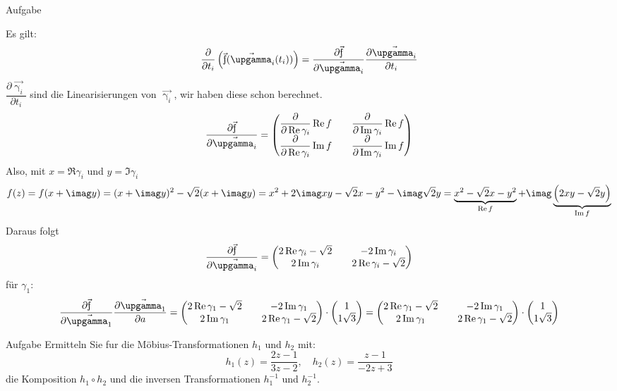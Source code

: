 \documentclass{scrartcl}
\begin{document}
\begin{section}{Aufgabe}
\begin{itemize}
Es gilt: \[\frac{\partial}{\partial t_i}\left(\f(\vec{\upgamma}_i(t_i))\right)=\dfrac{\partial \f}{\partial \vec{\upgamma_i}}\dfrac{\partial \vec{\upgamma_i}}{\partial t_i}\]
\(\dfrac{\partial \vec{\upgamma_i}}{\partial t_i}\) sind die Linearisierungen von $\vec{\upgamma_i}$, wir haben diese schon berechnet.
\[\dfrac{\partial \f}{\partial \vec{\upgamma_i}}=
\begin{pmatrix}
    \dfrac{\partial}{\partial \Re \gamma_i}\Re f&& \dfrac{\partial}{\partial \Im \gamma_i}\Re f\\
    \dfrac{\partial}{\partial \Re \gamma_i}\Im f&& \dfrac{\partial}{\partial \Im \gamma_i}\Im f
\end{pmatrix}\]
Also, mit \(x=\Re \gamma_i\) und \(y=\Im \gamma_i\)
\[f(z)=f(x+\imag y)
=(x+\imag y)^2-\sqrt{2} (x+\imag y)
=x^2+2 \imag x y-\sqrt{2} x-y^2-\imag \sqrt{2} y
=\underbrace{x^2-\sqrt{2} x-y^2}_{\Re f}
+\imag\underbrace{\left(2 x y-\sqrt{2} y\right)}_{\Im f}\]
Daraus folgt\[\frac{\partial \f}{\partial \vec{\upgamma_i}}=
\begin{pmatrix}
    2\Re \gamma_i -\sqrt{2}&& -2\Im \gamma_i\\
    2\Im \gamma_i&& 2\Re \gamma_i -\sqrt{2}
\end{pmatrix}\]
für \(\gamma_1\):
\[\frac{\partial \f}{\partial \vec{\upgamma_1}}\frac{\partial \vec{\upgamma_1}}{\partial a}=
\begin{pmatrix}
    2\Re \gamma_1 -\sqrt{2}&& -2\Im \gamma_1\\
    2\Im \gamma_1&& 2\Re \gamma_1 -\sqrt{2}
\end{pmatrix}
\cdot\begin{pmatrix}1\\1\sqrt{3}\end{pmatrix}
=
\begin{pmatrix}
    2\Re \gamma_1 -\sqrt{2}&& -2\Im \gamma_1\\
    2\Im \gamma_1&& 2\Re \gamma_1 -\sqrt{2}
\end{pmatrix}
\cdot\begin{pmatrix}1\\1\sqrt{3}\end{pmatrix}
\]

\end{itemize}


\end{section}
\begin{section}{Aufgabe}%
Ermitteln Sie fur die Möbius-Transformationen $h_1$ und $h_2$ mit:
\[h_1(z)=\frac{2z-1}{3z-2},\quad h_2(z)=\frac{z-1}{-2z+3}\]
die Komposition $h_1 \circ h_2$ und die inversen Transformationen $h_1^{-1}$ und $h_2^{-1}$.

\end{section}
\end{document}
